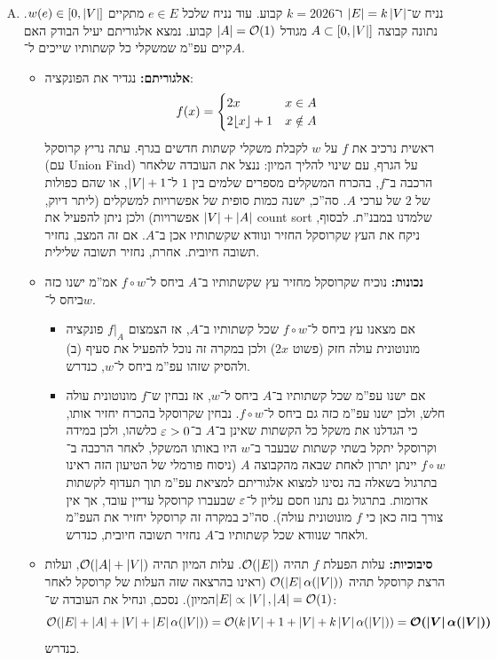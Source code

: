 \documentclass[]{../../../../tex/classes/homework}
\begin{document}
\begin{enumerate}[(A)]
\begin{proof}
			אם $T$ עפ''מ ביחס ל־$f \circ w$, אז בדומה לסעיף קודם יש ריצת קרוסקל עם $(f \circ w)(e_1) \le \cdots \le (f \circ w)(e_m)$ סידור של הקשתות. מכיוון ש־$f$ עולה \textit{חזק} מובטח לנו שהא''שים נשמרים גם בעבור $w(e_1) \le \cdots \le w(e_m)$, כלומר ריצת קרוסקל בסדר $e_1 \dots e_m$ תחזיר עפ''מ תקין גם ביחס ל־$w$, כנדרש. 
		\end{proof}
		\item נניח ש־$\left \lvert E \right \rvert = k \left \lvert V \right \rvert$ ו־$k = 2026$ קבוע. עוד נניח שלכל $e \in E$ מתקיים $w(e) \in [0, \left \lvert V \right \rvert]$. נתונה קבוצה $A \subset [0, \left \lvert V \right \rvert]$ מגודל $\left \lvert A \right \rvert = \mathcal{O}(1)$ קבוע. נמצא אלגוריתם יעיל הבודק האם קיים עפ''מ שמשקלי כל קשתותיו שייכים ל־$A$. 
		\begin{itemize}
			\item \textbf{אלגוריתם: }נגדיר את הפונקציה: 
			\[ f(x) = \begin{cases}
				2x & x \in A \\
				2\!\left\lfloor x \right\rfloor + 1 & x \notin A
			\end{cases} \]
			ראשית נרכיב את $f$ על $w$ לקבלת משקלי קשתות חדשים בגרף. עתה נריץ קרוסקל (עם Union Find) על הגרף, עם שינוי להליך המיון: ננצל את העובדה שלאחר הרכבה ב־$f$, בהכרח המשקלים מספרים שלמים בין $1$ ל־$\left \lvert V \right \rvert + 1$, או שהם כפולות של $2$ של ערכי $A$. סה''כ, ישנה כמות סופית של אפשרויות למשקלים (ליתר דיוק, $\left \lvert V \right \rvert + \left \lvert A \right \rvert$ אפשרויות) ולכן ניתן להפעיל את count sort שלמדנו במבנ''ת. לבסוף, ניקח את העץ שקרוסקל החזיר ונוודא שקשתותיו אכן ב־$A$. אם זה המצב, נחזיר תשובה חיובית. אחרת, נחזיר תשובה שלילית. 
			\item \textbf{נכונות: }נוכיח שקרוסקל מחזיר עץ שקשתותיו ב־$A$ ביחס ל־$f \circ w$ אמ''מ ישנו כזה ביחס ל־$w$. 
			\begin{itemize}
				\item[$\impliedby$]אם מצאנו עץ ביחס ל־$f \circ w$ שכל קשתותיו ב־$A$, אז הצמצום $f|_A$ פונקציה מונוטונית עולה חזק (פשוט $2x$) ולכן במקרה זה נוכל להפעיל את סעיף (ב) ולהסיק שזהו עפ''מ ביחס ל־$w$, כנדרש. 
				\item[$\implies$]אם ישנו עפ''מ שכל קשתותיו ב־$A$ ביחס ל־$w$, אז נבחין ש־$f$ מונוטונית עולה חלש, ולכן ישנו עפ''מ כזה גם ביחס ל־$f \circ w$. נבחין שקרוסקל בהכרח יחזיר אותו, כי הגדלנו את משקל כל הקשתות שאינן ב־$A$ ב־$\eg > 0$ כלשהו, ולכן במידה וקרוסקל יתקל בשתי קשתות שבעבר ב־$w$ היו באותו המשקל, לאחר הרכבה ב־$f \circ w$ יינתן יתרון לאחת שבאה מהקבוצה $A$ (ניסוח פורמלי של הטיעון הזה ראינו בתרגול בשאלה בה נסינו למצוא אלגוריתם למציאת עפ''מ תוך תעדוף לקשתות אדומות. בתרגול גם נתנו חסם עליון ל־$\eg$ שבעברו קרוסקל עדיין עובד, אך אין צורך בזה כאן כי $f$ מונוטונית עולה). סה''כ במקרה זה קרוסקל יחזיר את העפ''מ ולאחר שנוודא שכל קשתותיו ב־$A$ נחזיר תשובה חיובית, כנדרש. 
			\end{itemize}
			\item \textbf{סיבוכיות: }עלות הפעלת $f$ תהיה $\mathcal{O}(\left \lvert E \right \rvert)$. עלות המיון תהיה $\mathcal{O}(\left \lvert A \right \rvert + \left \lvert V \right \rvert)$, ועלות הרצת קרוסקל תהיה $\mathcal{O}(\left \lvert E \right \rvert \alpha(\left \lvert V \right \rvert))$ (ראינו בהרצאה שזה העלות של קרוסקל לאחר המיון). נסכם, ונחיל את העובדה ש־$\left \lvert E \right \rvert \propto \left \lvert V \right \rvert, \left \lvert A \right \rvert = \mathcal{O}(1)$: 
			\[ \mathcal{O}(\left \lvert E \right \rvert + \left \lvert A \right \rvert + \left \lvert V \right \rvert + \left \lvert E \right \rvert \alpha(\left \lvert V \right \rvert)) = \mathcal{O}(k\left \lvert V \right \rvert + 1 + \left \lvert V \right \rvert + k \left \lvert V \right \rvert \alpha(\left \lvert V \right \rvert)) = \bm{\mathcal{O}(\left \lvert V \right \rvert \alpha(\left \lvert V \right \rvert))} \]
			כנדרש. 
		\end{itemize}
	\end{enumerate}
\end{document}
